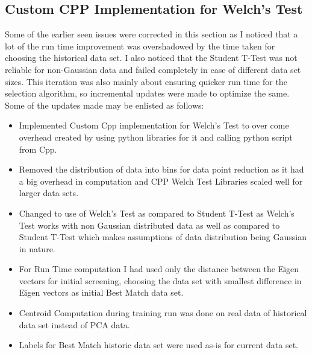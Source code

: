 \subsection{Custom CPP Implementation for Welch’s Test}
Some of the earlier seen issues were corrected in this section as I noticed that a lot of the run time improvement was overshadowed by the time taken for choosing the historical data set. I also noticed that the Student T-Test was not reliable for non-Gaussian data and failed completely in case of different data set sizes.
This iteration was also mainly about ensuring quicker run time for the selection algorithm, so incremental updates were made to optimize the same. Some of the updates made may be enlisted as follows:
\begin{itemize}
    \item Implemented Custom Cpp implementation for Welch’s Test to over come overhead created by using python libraries for it and calling python script from Cpp.
    \item Removed the distribution of data into bins for data point reduction as it had a big overhead in computation and CPP Welch Test Libraries scaled well for larger data sets.
    \item Changed to use of Welch’s Test as compared to Student T-Test as Welch’s Test works with non Gaussian distributed data as well as compared to Student T-Test which makes assumptions of data distribution being Gaussian in nature.
    \item For Run Time computation I had used only the distance between the Eigen vectors for initial screening, choosing the data set with smallest difference in Eigen vectors as initial Best Match data set.
    \item Centroid Computation during training run was done on real data of historical data set instead of PCA data.
    \item Labels for Best Match historic data set were used as-is for current data set.
\end{itemize}
